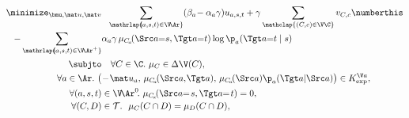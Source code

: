 {\allowdisplaybreaks
\begin{align*}
    \minimize_{\bmu, \mat u, \mat v} & ~~
    \sum_{\mathrlap{\!\!\!(a,s,t) \in \V\!\Ar}} (\beta_a \!- \alpha_a \gamma) u_{a,s,t}
    + \gamma \sum_{\mathclap{(C,c) \in \V\C}}  v_{C,c}
    \numberthis\label{prob:cluster-small-gamma}
    \\[-0.2ex]
    - \sum_{\mathrlap{\!\!\!(a,s,t) \in \smash{\V\!\Ar^+}}}&
        \alpha_a\gamma\,
        \mu_{C\!_a}\!(\Src a{=}s,\Tgt a {=} t)
        \log \p_a (\Tgt a{=}t\mid s)
\\[0.2ex]
\subjto&\quad
    \forall C \in \C.~\mu_C \in \Delta\V(C), \\[-0.2ex]
    \forall a \in \Ar.~
        \big(&\!- \! \mat u_a,\, \mu_{C\!_a}\!(\Src a,\mskip-2mu \Tgt a),\, \mu_{C\!_a}\!(\Src a) \p_a(\Tgt a | \Src a)\big) \in K_{\exp}^{\V a}, \\
    \forall (a,s,t) &\in \V\!\Ar^0\!.~
    \mu_{C\!_a}\!(\Src a{=}\mskip2mus, \Tgt a{=}\mskip2mut) = 0, \\[-0.2ex]
    \forall (C,D) &\in \mathcal T.~~ \mu_{C}(C \cap D) = \mu_{D}(C \cap D),\\[-0.3ex]

\end{align*}}
